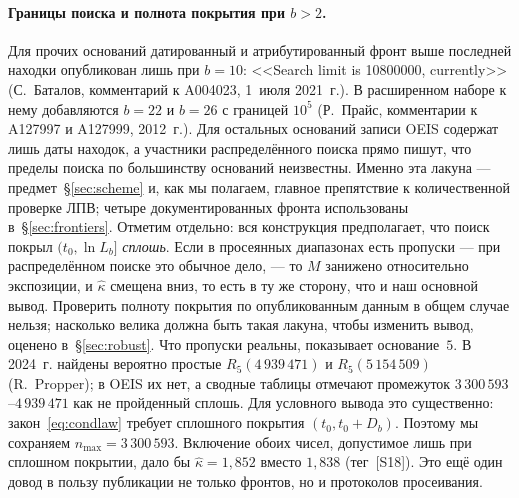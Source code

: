 \documentclass[11pt,a4paper]{article}
\theoremstyle{plain}
\theoremstyle{remark}
\begin{document}
\paragraph{Границы поиска и полнота покрытия при $b>2$.} Для прочих оснований
датированный и атрибутированный фронт выше последней находки опубликован лишь при
$b=10$: <<Search limit is 10800000, currently>> (С.~Баталов, комментарий к A004023,
1~июля 2021~г.). В расширенном наборе к нему добавляются $b=22$ и $b=26$ с
границей $10^5$ (Р.~Прайс, комментарии к A127997 и A127999, 2012~г.). Для
остальных оснований записи OEIS содержат лишь даты находок, а участники
распределённого поиска прямо пишут, что пределы поиска по большинству оснований
неизвестны. Именно эта лакуна --- предмет~\S\ref{sec:scheme} и, как мы полагаем,
главное препятствие к количественной проверке ЛПВ; четыре документированных фронта
использованы в~\S\ref{sec:frontiers}. Отметим
отдельно: вся конструкция предполагает, что поиск покрыл $(t_0,\ln L_b]$
\emph{сплошь}. Если в просеянных диапазонах есть пропуски --- при распределённом
поиске это обычное дело, --- то $M$ занижено относительно экспозиции, и $\hat\kappa$
смещена вниз, то есть в ту же сторону, что и наш основной вывод. Проверить полноту
покрытия по опубликованным данным в общем случае нельзя; насколько велика должна
быть такая лакуна, чтобы изменить вывод, оценено в~\S\ref{sec:robust}. Что пропуски реальны,
показывает основание~$5$. В 2024~г. найдены вероятно простые $R_5(4\,939\,471)$ и
$R_5(5\,154\,509)$ (R.~Propper); в OEIS их нет, а сводные таблицы отмечают
промежуток $3\,300\,593$--$4\,939\,471$ как не пройденный сплошь. Для условного
вывода это существенно: закон~\eqref{eq:condlaw} требует сплошного покрытия
$(t_0,t_0+D_b)$. Поэтому мы сохраняем $n_{\max}=3\,300\,593$. Включение обоих
чисел, допустимое лишь при сплошном покрытии, дало бы $\hat\kappa=1{,}852$ вместо
$1{,}838$ (тег~[S18]). Это ещё один довод в пользу публикации не только фронтов, но
и протоколов просеивания.
\end{document}

